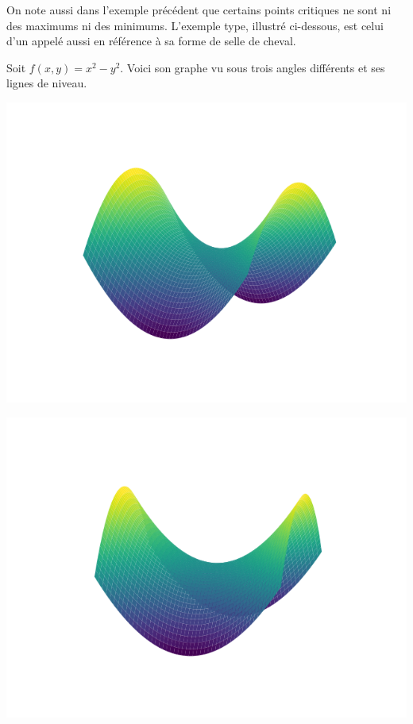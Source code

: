 \documentclass[11pt,class=report,crop=false]{standalone}
\begin{document}
On note aussi dans l'exemple précédent que certains points critiques ne sont ni des maximums ni des minimums. L'exemple type, illustré ci-dessous, est celui d'un  appelé aussi  en référence à sa forme de selle de cheval.

\begin{exemple}
Soit $f(x,y)=x^2-y^2$.
Voici son graphe vu sous trois angles différents et ses lignes de niveau.

\begin{center}
\includegraphics[scale=\myscale,scale=0.7]{figures/gradient-surface-3a}
\end{center}
\begin{center}
\includegraphics[scale=\myscale,scale=0.5]{figures/gradient-surface-3b}

\end{center}
\end{exemple}
\end{document}
